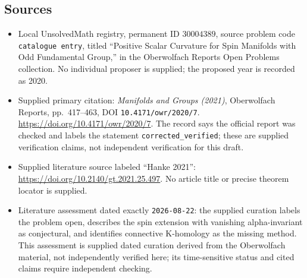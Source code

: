 \documentclass[11pt]{article}
\begin{document}
\subsection{Sources}
\begin{itemize}
\item Local UnsolvedMath registry, permanent ID \(30004389\), source problem code \texttt{catalogue entry}, titled ``Positive Scalar Curvature for Spin Manifolds with Odd Fundamental Group,'' in the Oberwolfach Reports Open Problems collection. No individual proposer is supplied; the proposed year is recorded as 2020.
\item Supplied primary citation: \emph{Manifolds and Groups (2021)}, Oberwolfach Reports, pp.~417--463, DOI \texttt{10.4171/owr/2020/7}. \url{https://doi.org/10.4171/owr/2020/7}. The record says the official report was checked and labels the statement \texttt{corrected\_verified}; these are supplied verification claims, not independent verification for this draft.
\item Supplied literature source labeled ``Hanke 2021'': \url{https://doi.org/10.2140/gt.2021.25.497}. No article title or precise theorem locator is supplied.
\item Literature assessment dated exactly \texttt{2026-08-22}: the supplied curation labels the problem open, describes the spin extension with vanishing alpha-invariant as conjectural, and identifies connective K-homology as the missing method. This assessment is supplied dated curation derived from the Oberwolfach material, not independently verified here; its time-sensitive status and cited claims require independent checking.
\end{itemize}
\end{document}
